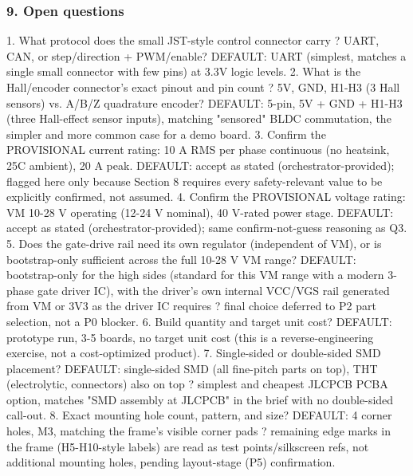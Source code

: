 \documentclass[11pt,a4paper]{article}
\begin{document}
\subsubsection*{9. Open questions}
1. What protocol does the small JST-style control connector carry ? UART, CAN, or step/direction + PWM/enable? DEFAULT: UART (simplest, matches a single small connector with few pins) at 3.3V logic levels. 2. What is the Hall/encoder connector's exact pinout and pin count ? 5V, GND, H1-H3 (3 Hall sensors) vs. A/B/Z quadrature encoder? DEFAULT: 5-pin, 5V + GND + H1-H3 (three Hall-effect sensor inputs), matching "sensored" BLDC commutation, the simpler and more common case for a demo board. 3. Confirm the PROVISIONAL current rating: 10 A RMS per phase continuous (no heatsink, 25C ambient), 20 A peak. DEFAULT: accept as stated (orchestrator-provided); flagged here only because Section 8 requires every safety-relevant value to be explicitly confirmed, not assumed. 4. Confirm the PROVISIONAL voltage rating: VM 10-28 V operating (12-24 V nominal), 40 V-rated power stage. DEFAULT: accept as stated (orchestrator-provided); same confirm-not-guess reasoning as Q3. 5. Does the gate-drive rail need its own regulator (independent of VM), or is bootstrap-only sufficient across the full 10-28 V VM range? DEFAULT: bootstrap-only for the high sides (standard for this VM range with a modern 3-phase gate driver IC), with the driver's own internal VCC/VGS rail generated from VM or 3V3 as the driver IC requires ? final choice deferred to P2 part selection, not a P0 blocker. 6. Build quantity and target unit cost? DEFAULT: prototype run, 3-5 boards, no target unit cost (this is a reverse-engineering exercise, not a cost-optimized product). 7. Single-sided or double-sided SMD placement? DEFAULT: single-sided SMD (all fine-pitch parts on top), THT (electrolytic, connectors) also on top ? simplest and cheapest JLCPCB PCBA option, matches "SMD assembly at JLCPCB" in the brief with no double-sided call-out. 8. Exact mounting hole count, pattern, and size? DEFAULT: 4 corner holes, M3, matching the frame's visible corner pads ? remaining edge marks in the frame (H5-H10-style labels) are read as test points/silkscreen refs, not additional mounting holes, pending layout-stage (P5) confirmation.
\end{document}
